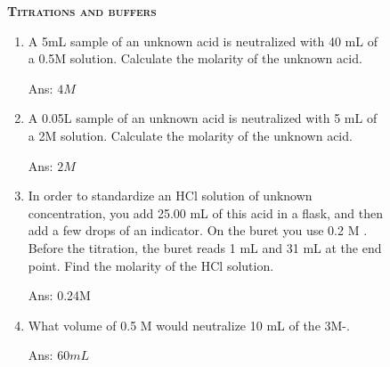 \begin{figure*}[!ht] %
\begin{summary}[boxed title style={colback=white},colback=white]
{\raggedright\textsc{\textbf{Titrations and buffers}}\par}
\begin{multicols}{2}
\begin{enumerate}[nolistsep]
\item A 5mL sample of an unknown acid is neutralized with 40 mL of a  0.5M solution. Calculate the molarity of the unknown acid.
\begin{flushright}\small Ans: $4M$ \end{flushright}
\item A 0.05L sample of an unknown acid is neutralized with 5 mL of a  2M solution. Calculate the molarity of the unknown acid.
\begin{flushright}\small Ans: $2M$ \end{flushright}
\item In order to standardize an HCl solution of unknown concentration, you add 25.00 mL of this acid in a  flask, and then add a few drops of an indicator. On the buret you use 0.2 M . Before the titration, the buret reads 1 mL and 31 mL at the end point. Find the molarity of the HCl solution.
\begin{flushright}\small Ans: 0.24M \end{flushright}
\item What volume of 0.5 M  would neutralize 10 mL of the 3M-. 
\begin{flushright}\small Ans: $60mL$ \end{flushright}
\end{enumerate}
\end{multicols}
\end{summary}
\end{figure*} %